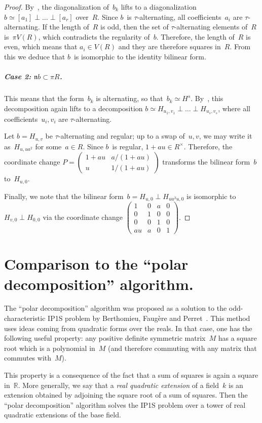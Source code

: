 \documentclass{lms}
\let\fr\mathfrak
\def\mat#1{\begin{pmatrix}#1\end{pmatrix}}
\begin{document}
\begin{proof}
By~\cite[Corollary 3.4]{baeza1978quadratic},
the diagonalization of~$b_k$ lifts to a diagonalization
$b ≃ [a_1] ⟂ … ⟂ [a_r]$ over~$R$.
Since $b$~is $τ$-alternating, all coefficients~$a_i$ are $τ$-alternating.
If the length of~$R$ is odd, then the set of $τ$-alternating elements of~$R$
is~$π V(R)$, which contradicts the regularity of~$b$.
Therefore, the length of~$R$ is even, which means that $a_i ∈ V(R)$ and they are
therefore squares in~$R$.
From this we deduce that $b$~is isomorphic to the identity bilinear form.

\subparagraph{Case 2: $\fr n b ⊂ π R$.}
This means that the form~$b_k$ is alternating, so that~$b_k ≃ H^s$.
By~\cite[Corollary 3.4]{baeza1978quadratic}, this decomposition again lifts to a
decomposition $b ≃ H_{u_1, v_1} ⟂ … ⟂ H_{u_s, v_s}$, where all
coefficients~$u_i, v_i$ are $τ$-alternating.

Let $b = H_{u,v}$ be $τ$-alternating and regular; up to a swap of~$u, v$, we
may write it as~$H_{u, u a^2}$ for some~$a ∈ R$. Since $b$~is
regular, $1 + a u ∈ R^{×}$. Therefore, the coordinate
change $P = \mat{1+a u & a/(1+a u) \\ u & 1/(1+a u)}$ transforms the
bilinear form~$b$ to~$H_{u, 0}$.

Finally, we note that the bilinear form~$b = H_{u, 0} ⟂ H_{u a^2 u, 0}$ is
isomorphic to~$H_{v, 0} ⟂ H_{0,0}$ via the coordinate change
$\mat{1 & 0 & a & 0\\0&1&0&0\\0&0&1&0\\au & a & 0 & 1}$.
\end{proof}


\section{Comparison to the ``polar decomposition'' algorithm.}
\label{ap:polar}

The “polar decomposition” algorithm was proposed as a solution to
the odd-characteristic IP1S problem by
Berthomieu, Faugère and Perret~\cite{2013bfp}.
This method uses ideas coming from quadratic forms over the reals.
In that case, one has the following useful property:
any positive definite symmetric matrix~$M$ has a square root
which is a polynomial in~$M$
(and therefore commuting with any matrix that commutes with~$M$).

This property is a consequence of the fact
that a sum of squares is again a square in~$ℝ$.
More generally, we say that a \emph{real quadratic extension} of a field~$k$
is an extension obtained by adjoining the square root of a sum of squares.
Then the “polar decomposition” algorithm solves the IP1S problem
over a tower of real quadratic extensions of the base field.
\end{document}
